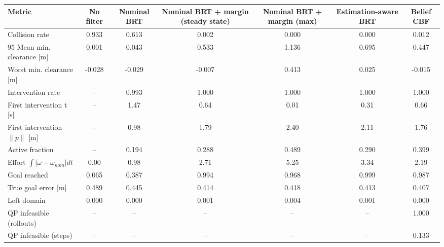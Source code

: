 \begin{tabular}{lcccccc}
\toprule
Metric & No filter & Nominal BRT & Nominal BRT + margin (steady state) & Nominal BRT + margin (max) & Estimation-aware BRT & Belief CBF \\
\midrule
Collision rate & 0.933 & 0.613 & 0.002 & 0.000 & 0.000 & 0.012 \\
95%
Mean min. clearance [m] & 0.001 & 0.043 & 0.533 & 1.136 & 0.695 & 0.447 \\
Worst min. clearance [m] & -0.028 & -0.029 & -0.007 & 0.413 & 0.025 & -0.015 \\
Intervention rate & -- & 0.993 & 1.000 & 1.000 & 1.000 & 1.000 \\
First intervention t [s] & -- & 1.47 & 0.64 & 0.01 & 0.31 & 0.66 \\
First intervention $\|p\|$ [m] & -- & 0.98 & 1.79 & 2.40 & 2.11 & 1.76 \\
Active fraction & -- & 0.194 & 0.288 & 0.489 & 0.290 & 0.399 \\
Effort $\int|\omega-\omega_{nom}|dt$ & 0.00 & 0.98 & 2.71 & 5.25 & 3.34 & 2.19 \\
Goal reached & 0.065 & 0.387 & 0.994 & 0.968 & 0.999 & 0.987 \\
True goal error [m] & 0.489 & 0.445 & 0.414 & 0.418 & 0.413 & 0.407 \\
Left domain & 0.000 & 0.000 & 0.001 & 0.004 & 0.001 & 0.000 \\
QP infeasible (rollouts) & -- & -- & -- & -- & -- & 1.000 \\
QP infeasible (steps) & -- & -- & -- & -- & -- & 0.133 \\
\bottomrule
\end{tabular}
